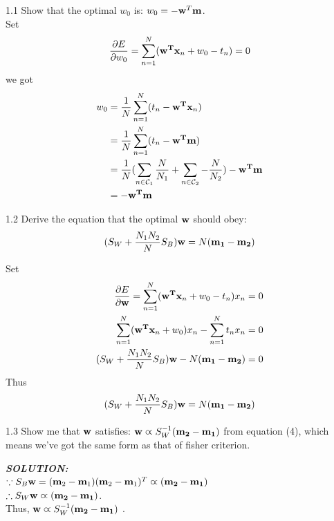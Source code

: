 \documentclass{article}
\theoremstyle{definition}
\theoremstyle{definition}
\theoremstyle{remark}
\begin{document}
1.1 Show that the optimal $w_{0}$ is: $w_{0}=-\bold{w}^{T}\bold{m}$.
\\
Set
\[\frac{\partial E}{\partial w_{0}}=\sum_{n=1}^{N}(\bold{w^{T}}\bold{x}_{n}+w_{0}-t_{n})=0\]
we got
\begin{equation}\nonumber
\begin{aligned}
w_{0} &= \frac{1}{N}\sum_{n=1}^{N}(t_{n}-\bold{w^{T}}\bold{x}_{n})\\
&= \frac{1}{N}\sum_{n=1}^{N}(t_{n}- \bold{w^{T}}\bold{m})\\
&= \frac{1}{N}(\sum_{n\in\mathcal{C}_{1}}\frac{N}{N_1}+\sum_{n\in\mathcal{C}_{2}}-\frac{N}{N_2}) - \bold{w^{T}}\bold{m}\\
&= -\bold{w^{T}}\bold{m}
\end{aligned}
\end{equation}

1.2 Derive the equation that the optimal $\bold{w}$ should obey:
\begin{eqnarray}
(S_{W}+\frac{N_{1}N_{2}}{N}S_{B})\bold{w}=N(\bold{m_{1}}-\bold{m_{2}})
\end{eqnarray}

Set
\begin{equation}\nonumber
\begin{aligned}
\frac{\partial E}{\partial \bold{w}}=\sum_{n=1}^{N}(\bold{w^{T}}\bold{x}_{n}+w_0-t_{n})x_n&=0\\
\sum_{n=1}^{N}(\bold{w^{T}}\bold{x}_{n}+w_0)x_n-\sum_{n=1}^{N}t_{n}x_n&=0\\
(S_{W}+\frac{N_{1}N_{2}}{N}S_{B})\bold{w}-N(\bold{m_{1}}-\bold{m_{2}})&=0
\end{aligned}
\end{equation}
Thus
\begin{eqnarray}\nonumber
(S_{W}+\frac{N_{1}N_{2}}{N}S_{B})\bold{w}=N(\bold{m_{1}}-\bold{m_{2}})
\end{eqnarray}

1.3 Show me that $\bold{w}$ satisfies: $\bold{w}\varpropto S_{W}^{-1}(\bold{m_{2}}-\bold{m_{1}})$ from equation (4), which means we've got the same form as that of fisher criterion.

\emph{\textbf{SOLUTION:}}\\
$\because S_B\bold{w}=(\bold{m}_{2}-\bold{m}_{1})(\bold{m}_{2}-\bold{m}_{1})^{T}\varpropto (\bold{m_{2}}-\bold{m_{1}})$\\
$\therefore S_W\bold{w}\varpropto (\bold{m_{2}}-\bold{m_{1}})$.\\
Thus,  $\bold{w}\varpropto S_{W}^{-1}(\bold{m_{2}}-\bold{m_{1}})$ .
\\
\end{document}
